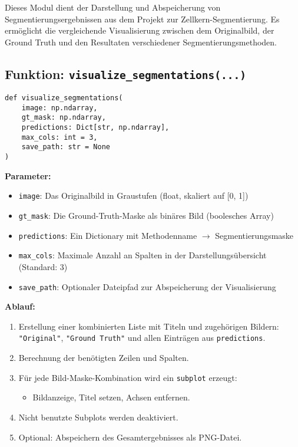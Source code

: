 \documentclass[a4paper,12pt]{article}
\begin{document}
Dieses Modul dient der Darstellung und Abspeicherung von Segmentierungsergebnissen aus dem Projekt zur Zellkern-Segmentierung. Es ermöglicht die vergleichende Visualisierung zwischen dem Originalbild, der Ground Truth und den Resultaten verschiedener Segmentierungsmethoden.

\subsection*{ Funktion: \texttt{visualize\_segmentations(...)}}

\begin{verbatim}
def visualize_segmentations(
    image: np.ndarray,
    gt_mask: np.ndarray,
    predictions: Dict[str, np.ndarray],
    max_cols: int = 3,
    save_path: str = None
)
\end{verbatim}

\textbf{Parameter:}
\begin{itemize}
  \item \texttt{image}: Das Originalbild in Graustufen (float, skaliert auf [0, 1])
  \item \texttt{gt\_mask}: Die Ground-Truth-Maske als binäres Bild (boolesches Array)
  \item \texttt{predictions}: Ein Dictionary mit Methodenname $\rightarrow$ Segmentierungsmaske
  \item \texttt{max\_cols}: Maximale Anzahl an Spalten in der Darstellungsübersicht (Standard: 3)
  \item \texttt{save\_path}: Optionaler Dateipfad zur Abspeicherung der Visualisierung
\end{itemize}

\textbf{Ablauf:}
\begin{enumerate}
  \item Erstellung einer kombinierten Liste mit Titeln und zugehörigen Bildern: \texttt{"Original"}, \texttt{"Ground Truth"} und allen Einträgen aus \texttt{predictions}.
  \item Berechnung der benötigten Zeilen und Spalten.
  \item Für jede Bild-Maske-Kombination wird ein \texttt{subplot} erzeugt:
  \begin{itemize}
    \item Bildanzeige, Titel setzen, Achsen entfernen.
  \end{itemize}
  \item Nicht benutzte Subplots werden deaktiviert.
  \item Optional: Abspeichern des Gesamtergebnisses als PNG-Datei.
\end{enumerate}
\end{document}
